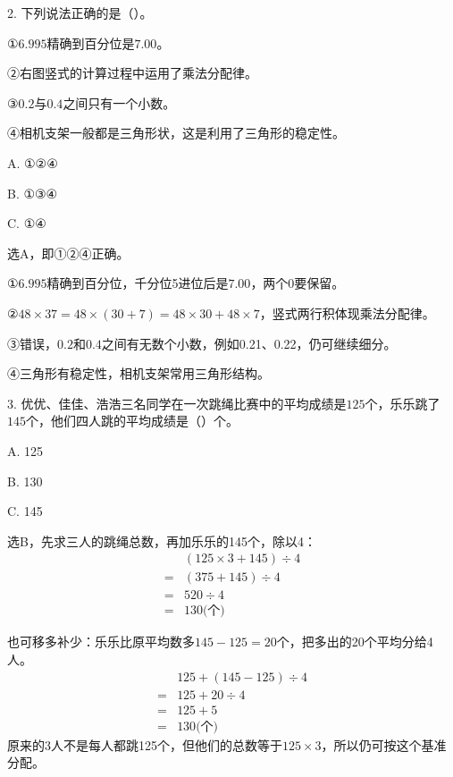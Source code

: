 2. 下列说法正确的是（\hspace{1.8em}）。\par ①\(6.995\)精确到百分位是\(7.00\)。\par ②右图竖式的计算过程中运用了乘法分配律。\par ③\(0.2\)与\(0.4\)之间只有一个小数。\par ④相机支架一般都是三角形状，这是利用了三角形的稳定性。\par
\noindent A. ①②④\par
\noindent B. ①③④\par
\noindent C. ①④\par
{}
\begin{BookAnswer}
选A，即①②④正确。\par ①\(6.995\)精确到百分位，千分位5进位后是\(7.00\)，两个0要保留。\par ②\(48\times37=48\times(30+7)=48\times30+48\times7\)，竖式两行积体现乘法分配律。\par ③错误，\allowbreak{}\(0.2\)和\(0.4\)之间有无数个小数，例如0.21、0.22，仍可继续细分。\par ④三角形有稳定性，相机支架常用三角形结构。
\end{BookAnswer}

3. 优优、佳佳、浩浩三名同学在一次跳绳比赛中的平均成绩是\(125\)个，乐乐跳了\(145\)个，他们四人跳的平均成绩是（\hspace{1.8em}）个。\par
\noindent A. 125\par
\noindent B. 130\par
\noindent C. 145\par
\begin{BookAnswer}
选B，先求三人的跳绳总数，再加乐乐的145个，除以4：\[\begin{aligned} &(125\times3+145)\div4\\ ={}&(375+145)\div4\\ ={}&520\div4\\ ={}&130\text{(个)}\end{aligned}\]\par 也可移多补少：乐乐比原平均数多\(145-125=20\)个，把多出的20个平均分给4人。\[\begin{aligned}&125+(145-125)\div4\\={}&125+20\div4\\={}&125+5\\={}&130\text{(个)}\end{aligned}\]原来的3人不是每人都跳125个，但他们的总数等于\(125\times3\)，所以仍可按这个基准分配。
\end{BookAnswer}

